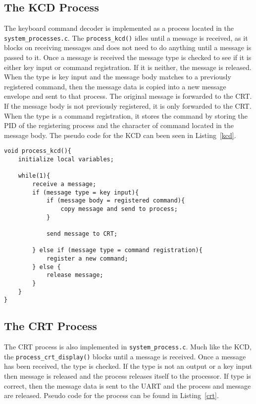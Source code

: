 \documentclass[oneside]{article}
\begin{document}
\subsection*{The KCD Process}
The keyboard command decoder is implemented as a process located in the
\texttt{system\_processes.c}. The \texttt{process\_kcd()} idles until a message
is received, as it blocks on receiving messages and does not need to do
anything until a message is passed to it. Once a message is received the
message type is checked to see if it is either key input or command
registration. If it is neither, the message is released. When the type is key
input and the message body matches to a previously registered command, then the
message data is copied into a new message envelope and sent to that process. The 
original message is forwarded to the CRT. If the message body is not
previously registered, it is only forwarded to the CRT. When the type is a
command registration, it stores the command by storing the PID of the
registering process and the character of command located in the message body.
The pseudo code for the KCD can been seen in Listing~\ref{kcd}. 

\begin{lstlisting}
void process_kcd(){
    initialize local variables;

    while(1){
        receive a message;
        if (message type = key input){
            if (message body = registered command){
                copy message and send to process;
            }
        
            send message to CRT;    

        } else if (message type = command registration){
            register a new command;
        } else {
            release message;
        }
    }
}
\end{lstlisting}

\subsection*{The CRT Process}
The CRT process is also implemented in \texttt{system\_process.c}. Much like
the KCD, the \texttt{process\_crt\_display()} blocks until a message is
received. Once a message has been received, the type is checked. If the type is
not an output or a key input then message is released and the process releases
itself to the processor. If type is correct, then the message data is sent to
the UART and the process and message are released. Pseudo code for the process
can be found in Listing~\ref{crt}.
\end{document}
